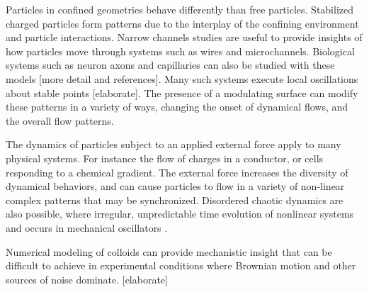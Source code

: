 \documentclass[twocolumn,preprintnumbers,amsmath,amssymb,aps,prx]{revtex4}
\begin{document}
Particles in confined geometries behave differently than free particles.
Stabilized charged particles form patterns
due to the interplay of the confining environment
and particle interactions.
Narrow channels studies are useful to provide insights 
of how particles move through systems 
such as wires and microchannels.
Biological systems such as
neuron axons and capillaries can also be studied
with these models [more detail and references].
Many such systems execute local oscillations
about stable points [elaborate].
The presence of a modulating surface
can modify these patterns in a variety of ways,
changing the onset of dynamical flows,
and the overall flow patterns.
%

The
dynamics of particles subject to 
an applied external force apply to many physical systems.
For instance the flow of charges in a conductor,
or cells responding to a chemical gradient.
The external force 
increases the diversity of dynamical behaviors,
and can cause particles to flow in
a variety of non-linear complex patterns
that may be 
synchronized.
Disordered chaotic dynamics are also possible,
where irregular, unpredictable time evolution of
nonlinear systems and occurs in mechanical oscillators \cite{chaos}.


Numerical modeling of colloids can provide mechanistic insight
that can be difficult to achieve in experimental conditions
where Brownian motion and other sources of noise dominate.
[elaborate]



\end{document}
